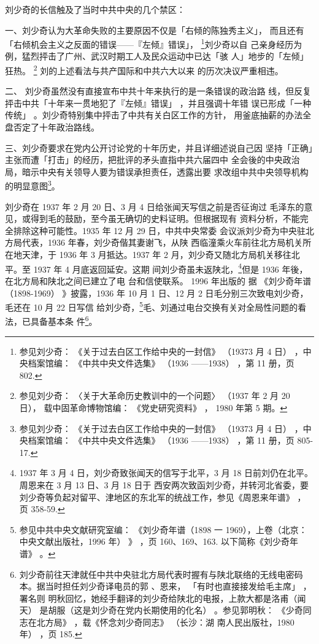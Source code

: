 刘少奇的长信触及了当时中共中央的几个禁区：

一、刘少奇认为大革命失败的主要原因不仅是「右倾的陈独秀主义」，
而且还有「右倾机会主义之反面的错误——『左倾』错误」， \footnote{参见刘少奇：
《关于过去白区工作给中央的一封信》
（19373 月 4 日）
，中央档案馆编：
《中共中央文件选集》
（1936
——1938）
，第 11 册，页 802.}刘少奇以自 
己亲身经历为例，猛烈抨击了广州、武汉时期工人及民众运动中已达「骇
人」地步的「左倾」狂热。
\footnote{参见刘少奇：
〈关于大革命历史教训中的一个问题〉
（1937 年 2 月 20 日）， 载中固革命博物馆编：
《党史研究资料》 ， 1980 年第 5 期。}
刘的上述看法与共产国际和中共六大以来
的历次决议严重相违。

二、
刘少奇虽然没有直接宣布中共十年来执行的是一条错误的政治路
线，但反复抨击中共「十年来一贯地犯了『左倾』错误」
，并且强调十年错
误已形成「一种传统」
。刘少奇特别集中抨击了中共有关白区工作的方针，
用釜底抽薪的办法全盘否定了十年政治路线。

三、刘少奇要求在党内公开讨论党的十年历史，并且详细述说自己因
坚持「正确」主张而遭「打击」的经历，把批评的矛头直指中共六届四中
全会後的中央政治局，暗示中央有关领导人要为错误承担责任，透露出要
求改组中共中央领导机构的明显意图\footnote{参见刘少奇：
《关于过去白区工作给中央的一封信》
（19373 月 4 日）
，中央档案馆编：
《中共中央文件选集》
（1936
——1938）
，第 11 册，页 805-17.}。

刘少奇在 1937 年 2 月 20 日、3 月 4 日给张闻天写信之前是否征询过
毛泽东的意见，或得到毛的鼓励，至今虽无确切的史料证明。但根据现有
资料分析，不能完全排除这种可能性。1935 年 12 月 29 日，中共中央常委
会议派刘少奇为中央驻北方局代表，1936 年春，刘少奇偕其妻谢飞，从陕
西临潼乘火车前往北方局机关所在地天津，于 1936 年 3 月抵达。1937 年
2 月，刘少奇又随北方局机关移往北平。至 1937 年 4 月底返回延安。这期
间刘少奇虽未返陕北，\footnote{1937 年 3 月 4 日，刘少奇致张闻天的信写于北平，3 月 18 日前刘仍在北平。周恩来在 3 月 13 日、3 月 18 日于
西安两次致函刘少奇，并转河北省委，要刘少奇等负起对留平、津地区的东北军的统战工作，参见《周恩来年谱》 ，页
358-59.}但是 1936 年後，在北方局和陕北之间已建立了电
台和信使联系。 1996 年出版的
据 《刘少奇年谱（1898-1969） 》披露，1936
年 10 月 1 日、12 月 2 日毛分别三次致电刘少奇，毛还在 10 月 22 日写信
给刘少奇，\footnote{ 参见中共中央文献研究室编：
《刘少奇年谱（1898 一 1969），上卷（北京：中央文献出版社，1996 年）
》 ，页 160、169、163. 以下简称《刘少奇年谱》
。}毛、刘通过电台交换有关对全局性问题的看法，已具备基本条
件\footnote{刘少奇前往天津就任中共中央驻北方局代表时握有与陕北联络的无线电密码本。据当时担任刘少奇译电员的郭
、恩来，
「有时也直接接发给毛主席」
，署名则
明秋回忆，她经手翻译的刘少奇给陕北的电报，上款大都是洛甫（闻天）
是胡服（这是刘少奇在党内长期使用的化名）
。参见郭明秋：
《少奇同志在北方局》
，载《怀念刘少奇同志》
（长沙：湖
南人民出版社，1980 年）
，页 185. }。

